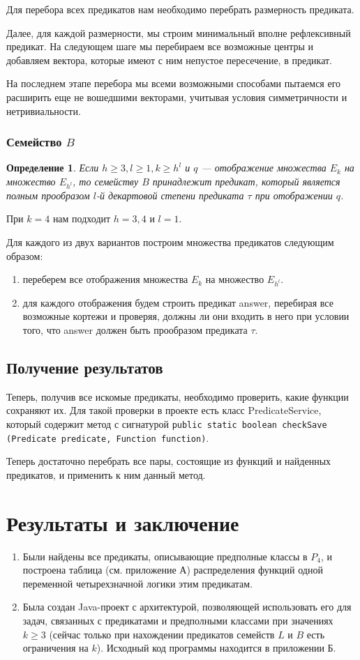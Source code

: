 \documentclass[a4paper,14pt]{extreport}
\newtheorem{opr}{Определение}
\begin{document}
Для перебора всех предикатов нам необходимо перебрать размерность предиката.

Далее, для каждой размерности, мы строим минимальный вполне рефлексивный предикат.
На следующем шаге мы перебираем все возможные центры и добавляем вектора, которые имеют с ним непустое пересечение, в предикат.

На последнем этапе перебора мы  всеми возможными способами пытаемся его расширить еще не вошедшими векторами, учитывая условия симметричности и нетривиальности.

\subsection{Семейство $B$}
\begin{opr}
Если $h \geqslant 3, l \geqslant 1, k \geqslant h^l$ и $q$ — отображение множества $E_k$ на  множество $E_{h^l}$, то семейству $B$ принадлежит предикат, который является полным прообразом $l$-й декартовой степени предиката $\tau$ при отображении $q$.
\end{opr}
При $k=4$ нам подходит $h=3,4$ и $l=1$.

Для каждого из двух вариантов построим множества предикатов следующим образом:
\begin{enumerate}
\item переберем все отображения множества $E_k$ на  множество $E_{h^l}$.
\item для каждого отображения будем строить предикат answer, перебирая все возможные кортежи и проверяя, должны ли они входить в него при условии того, что answer должен быть прообразом предиката $\tau$.
\end{enumerate} 

\section{Получение результатов}
Теперь, получив все искомые предикаты, необходимо проверить, какие функции сохраняют их. Для такой проверки в проекте есть класс PredicateService, который содержит метод с сигнатурой {\tt public static boolean checkSave (Predicate predicate, Function function)}. 

Теперь достаточно перебрать все пары, состоящие из функций и найденных предикатов, и применить к ним данный метод.

\newpage
\chapter{Результаты и заключение}
\begin{enumerate}
\item Были найдены все предикаты, описывающие предполные классы в $P_4$, и построена таблица (см. приложение А) распределения функций одной переменной четырехзначной логики этим предикатам. 
\item Была создан Java-проект с архитектурой, позволяющей использовать его для задач, связанных с предикатами и предполными классами при значениях $k \geqslant 3$ (сейчас только при нахождении предикатов семейств $L$ и $B$ есть ограничения на $k$).
Исходный код программы находится в приложении Б.
\end{enumerate}
\end{document}
